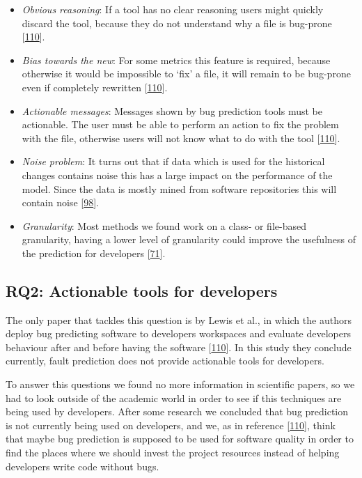 \documentclass[]{book}
\providecommand{\tightlist}{%
  \setlength{\itemsep}{0pt}\setlength{\parskip}{0pt}}
\begin{document}
\begin{itemize}
\tightlist
\item
  \emph{Obvious reasoning}: If a tool has no clear reasoning users might
  quickly discard the tool, because they do not understand why a file is
  bug-prone {[}\protect\hyperlink{ref-Lewis2013}{110}{]}.
\item
  \emph{Bias towards the new}: For some metrics this feature is
  required, because otherwise it would be impossible to `fix' a file, it
  will remain to be bug-prone even if completely rewritten
  {[}\protect\hyperlink{ref-Lewis2013}{110}{]}.
\item
  \emph{Actionable messages}: Messages shown by bug prediction tools
  must be actionable. The user must be able to perform an action to fix
  the problem with the file, otherwise users will not know what to do
  with the tool {[}\protect\hyperlink{ref-Lewis2013}{110}{]}.
\item
  \emph{Noise problem}: It turns out that if data which is used for the
  historical changes contains noise this has a large impact on the
  performance of the model. Since the data is mostly mined from software
  repositories this will contain noise
  {[}\protect\hyperlink{ref-Kim2011}{98}{]}.
\item
  \emph{Granularity}: Most methods we found work on a class- or
  file-based granularity, having a lower level of granularity could
  improve the usefulness of the prediction for developers
  {[}\protect\hyperlink{ref-giger2012}{71}{]}.
\end{itemize}

\subsection{RQ2: Actionable tools for
developers}\label{rq2-actionable-tools-for-developers}

The only paper that tackles this question is by Lewis et al., in which
the authors deploy bug predicting software to developers workspaces and
evaluate developers behaviour after and before having the software
{[}\protect\hyperlink{ref-Lewis2013}{110}{]}. In this study they
conclude currently, fault prediction does not provide actionable tools
for developers.

To answer this questions we found no more information in scientific
papers, so we had to look outside of the academic world in order to see
if this techniques are being used by developers. After some research we
concluded that bug prediction is not currently being used on developers,
and we, as in reference {[}\protect\hyperlink{ref-Lewis2013}{110}{]},
think that maybe bug prediction is supposed to be used for software
quality in order to find the places where we should invest the project
resources instead of helping developers write code without bugs.
\end{document}
